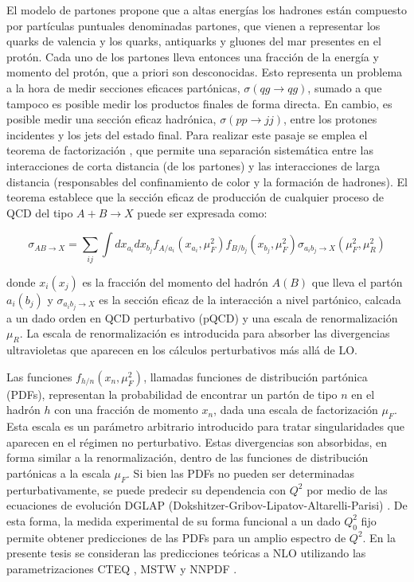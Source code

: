El modelo de partones propone que a altas energías los hadrones están compuesto por partículas puntuales denominadas partones, que vienen a representar los quarks de valencia y los quarks, antiquarks y gluones del mar presentes en el protón. Cada uno de los partones lleva entonces una fracción de la energía y momento del protón, que a priori son desconocidas. Esto representa un problema a la hora de medir secciones eficaces partónicas, $\sigma(qg\to qg)$, sumado a que tampoco es posible medir los productos finales de forma directa. En cambio, es posible medir una sección eficaz hadrónica, $\sigma(pp\to jj)$, entre los protones incidentes y los jets del estado final. Para realizar este pasaje se emplea el teorema de factorización \cite{ELLIS1978281}, que permite una separación sistemática
entre las interacciones de corta distancia (de los partones) y las interacciones de larga distancia (responsables del confinamiento de color y la formación de hadrones). El teorema establece que la sección eficaz de producción de cualquier proceso de QCD del tipo $A+B\to X$ puede ser expresada como:

\begin{equation}
	\label{eq:xs_fact}
	\sigma_{AB\to X} = \sum_{ij} \int dx_{a_i} dx_{b_j} f_{A/a_i}(x_{a_i}, \mu_{F}^2) f_{B/b_j}(x_{b_j}, \mu_{F}^2) \sigma_{a_i b_j \to X}(\mu_{F}^2, \mu_{R}^2)
\end{equation}
%

donde $x_i(x_j)$ es la fracción del momento del hadrón $A(B)$ que lleva el partón $a_i(b_j)$ y $\sigma_{a_i b_j \to X}$ es la sección eficaz de la interacción a nivel partónico, calcada a un dado orden en QCD perturbativo (pQCD) y una escala de renormalización $\mu_R$. La escala de renormalización es introducida
para absorber las divergencias ultravioletas que aparecen en los cálculos perturbativos más
allá de LO.

Las funciones $f_{h/n}(x_{n}, \mu_{F}^2)$, llamadas funciones de distribución partónica (PDFs), representan la probabilidad de encontrar un partón de tipo $n$ en el hadrón $h$ con una fracción de
momento $x_n$, dada una escala de factorización $\mu_{F}$. Esta escala es un parámetro arbitrario
introducido para tratar singularidades que aparecen en el régimen no perturbativo. Estas
divergencias son absorbidas, en forma similar a la renormalización, dentro de las funciones
de distribución partónicas a la escala $\mu_F$. Si bien las PDFs no pueden ser determinadas
perturbativamente, se puede predecir su dependencia con $Q^2$ por medio de las ecuaciones
de evolución DGLAP (Dokshitzer-Gribov-Lipatov-Altarelli-Parisi) \cite{dis,lipatovparton,altarelli-parisi}. De esta forma, la
medida experimental de su forma funcional a un dado $Q^2_0$ fijo permite obtener predicciones
de las PDFs para un amplio espectro de $Q^2$. En la presente tesis se consideran las predicciones teóricas a NLO utilizando las parametrizaciones CTEQ \cite{cteq}, MSTW \cite{mstw1, mstw2, mstw3} y NNPDF \cite{nnpdf}.

